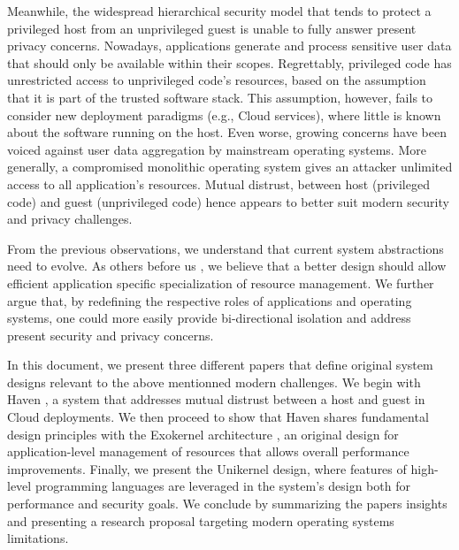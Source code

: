Meanwhile, the widespread hierarchical security model that tends to protect a privileged host from an unprivileged guest is unable to fully answer present privacy concerns.
Nowadays, applications generate and process sensitive user data that should only be available within their scopes.
Regrettably, privileged code has unrestricted access to unprivileged code's resources, based on the assumption that it is part of the trusted software stack.
This assumption, however, fails to consider new deployment paradigms (e.g., Cloud services), where little is known about the software running on the host.
Even worse, growing concerns have been voiced against user data aggregation by mainstream operating systems\cite{microsoftspy}.
More generally, a compromised monolithic operating system gives an attacker unlimited access to all application's resources.
Mutual distrust, between host (privileged code) and guest (unprivileged code) hence appears to better suit modern security and privacy challenges.

From the previous observations, we understand that current system abstractions need to evolve.
As others before us \cite{DBLP:conf/sosp/EnglerKO95,DBLP:conf/hotos/EnglerK95,DBLP:conf/sosp/KaashoekEGBHMPGM97,DBLP:journals/tocs/CaoFKL96,DBLP:journals/sigops/HartyC92}, we believe that a better design should allow efficient application specific specialization of resource management.
We further argue that, by redefining the respective roles of applications and operating systems, one could more easily provide bi-directional isolation and address present security and privacy concerns.

In this document, we present three different papers that define original system designs relevant to the above mentionned modern challenges.
We begin with Haven \cite{DBLP:journals/tocs/BaumannPH15}, a system that addresses mutual distrust between a host and guest in Cloud deployments.
We then proceed to show that Haven shares fundamental design principles with the Exokernel architecture \cite{DBLP:conf/sosp/EnglerKO95}, an original design for application-level management of resources that allows overall performance improvements.
Finally, we present the Unikernel \cite{DBLP:conf/asplos/MadhavapeddyMRSSGSHC13} design, where features of high-level programming languages are leveraged in the system's design both for performance and security goals.
We conclude by summarizing the papers insights and presenting a research proposal targeting modern operating systems limitations.